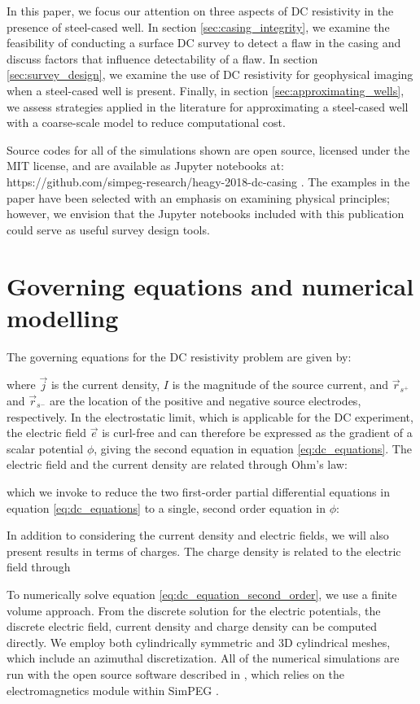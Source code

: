 In this paper, we focus our attention on three aspects of DC resistivity in the presence of steel-cased well. In section \ref{sec:casing_integrity}, we examine the feasibility of conducting a surface DC survey to detect a flaw in the casing and discuss factors that influence detectability of a flaw. In section \ref{sec:survey_design}, we examine the use of DC resistivity for geophysical imaging when a steel-cased well is present. Finally, in section \ref{sec:approximating_wells}, we assess strategies applied in the literature for approximating a steel-cased well with a coarse-scale model to reduce computational cost.

Source codes for all of the simulations shown are open source, licensed under the MIT license, and are available as Jupyter notebooks at: https://github.com/simpeg-research/heagy-2018-dc-casing \citep{Heagy2018b}. The examples in the paper have been selected with an emphasis on examining physical principles; however, we envision that the Jupyter notebooks included with this publication could serve as useful survey design tools.

\section{Governing equations and numerical modelling}
The governing equations for the DC resistivity problem are given by:

where $\vec{j}$ is the current density, $I$ is the magnitude of the source current, and $\vec{r}_{s^+}$ and $\vec{r}_{s^-}$ are the location of the positive and negative source electrodes, respectively. In the electrostatic limit, which is applicable for the DC experiment, the electric field $\vec{e}$ is curl-free and can therefore be expressed as the gradient of a scalar potential $\phi$, giving the second equation in equation \ref{eq:dc_equations}. The electric field and the current density are related through Ohm’s law:

which we invoke to reduce the two first-order partial differential equations in equation \ref{eq:dc_equations} to a single, second order equation in $\phi$:

In addition to considering the current density and electric fields, we will also present results in terms of charges. The charge density is related to the electric field through


To numerically solve equation \ref{eq:dc_equation_second_order}, we use a finite volume approach. From the discrete solution for the electric potentials, the discrete electric field, current density and charge density can be computed directly. We employ both cylindrically symmetric and 3D cylindrical meshes, which include an azimuthal discretization. All of the numerical simulations are run with the open source software described in \citep{Heagy2018a}, which relies on the electromagnetics module within SimPEG \citep{Cockett2015, Heagy2017}.

